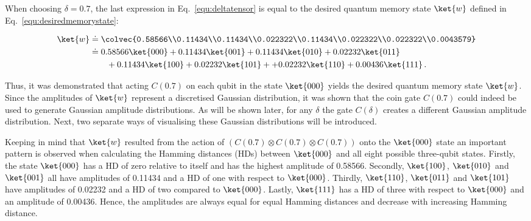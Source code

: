 When choosing $\delta = 0.7$, the last expression in Eq.~\ref{equ:deltatensor} is equal to the desired quantum memory state $\ket{w}$ defined in Eq.~\ref{equ:desiredmemorystate}:

\begin{align}
\label{equ:deltatensorsubbed}
\ket{w} &\doteq \colvec{0.58566\\0.11434\\0.11434\\0.022322\\0.11434\\0.022322\\0.022322\\0.0043579}\notag\\
&\doteq 0.58566 \ket{000} + 0.11434 \ket{001} + 0.11434 \ket{010} +
0.02232 \ket{011}\notag\\
&\quad \quad + 0.11434 \ket{100} + 0.02232 \ket{101} + + 0.02232 \ket{110} 
+ 0.00436 \ket{111}\, .
\end{align}

Thus, it was demonstrated that acting $C(0.7)$ on each qubit in the state $\ket{000}$ yields the desired quantum memory state $\ket{w}$. Since the amplitudes of $\ket{w}$ represent a discretised Gaussian distribution, it was shown that the coin gate $C(0.7)$ could indeed be used to generate Gaussian amplitude distributions. As will be shown later, for any $\delta$ the gate $C(\delta)$ creates a different Gaussian amplitude distribution. Next, two separate ways of visualising these Gaussian distributions will be introduced.

\newpage
Keeping in mind that $\ket{w}$ resulted from the action of $(C(0.7) \otimes C(0.7) \otimes C(0.7))$ onto the $\ket{000}$ state an important pattern is observed when calculating the Hamming distances (HDs) between $\ket{000}$ and all eight possible three-qubit states. Firstly, the state $\ket{000}$ has a HD of zero relative to itself and has the highest amplitude of 0.58566. Secondly, $\ket{100}$, $\ket{010}$ and $\ket{001}$ all have amplitudes of 0.11434 and a HD of one with respect to $\ket{000}$. Thirdly, $\ket{110}$, $\ket{011}$ and $\ket{101}$ have amplitudes of 0.02232 and a HD of two compared to $\ket{000}$. Lastly, $\ket{111}$ has a HD of three with respect to $\ket{000}$ and an amplitude of 0.00436. Hence, the amplitudes are always equal for equal Hamming distances and decrease with increasing Hamming distance.

